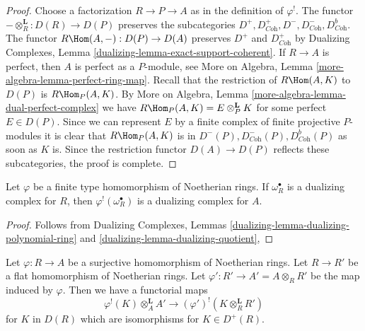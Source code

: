 \begin{proof}
Choose a factorization $R \to P \to A$ as in the definition of $\varphi^!$.
The functor $- \otimes_R^\mathbf{L} : D(R) \to D(P)$ preserves
the subcategories
$D^+, D^+_{\textit{Coh}}, D^-, D^-_{\textit{Coh}}, D^b_{\textit{Coh}}$.
The functor $R\Hom(A, -) : D(P) \to D(A)$
preserves $D^+$ and $D^+_{\textit{Coh}}$ by
Dualizing Complexes, Lemma \ref{dualizing-lemma-exact-support-coherent}.
If $R \to A$ is perfect, then $A$ is perfect as a $P$-module, see
More on Algebra, Lemma \ref{more-algebra-lemma-perfect-ring-map}.
Recall that the restriction of $R\Hom(A, K)$ to $D(P)$ is
$R\Hom_P(A, K)$. By More on Algebra, Lemma
\ref{more-algebra-lemma-dual-perfect-complex}
we have $R\Hom_P(A, K) = E \otimes_P^\mathbf{L} K$ for
some perfect $E \in D(P)$. Since we can represent $E$ by
a finite complex of finite projective $P$-modules
it is clear that $R\Hom_P(A, K)$ is in
$D^-(P), D^-_{\textit{Coh}}(P), D^b_{\textit{Coh}}(P)$
as soon as $K$ is. Since the restriction functor
$D(A) \to D(P)$ reflects these subcategories, the
proof is complete.
\end{proof}

\begin{lemma}
\label{lemma-shriek-dualizing-algebraic}
Let $\varphi$ be a finite type homomorphism of Noetherian rings.
If $\omega_R^\bullet$ is a dualizing complex for $R$, then
$\varphi^!(\omega_R^\bullet)$ is a dualizing complex for $A$.
\end{lemma}

\begin{proof}
Follows from Dualizing Complexes, Lemmas
\ref{dualizing-lemma-dualizing-polynomial-ring} and
\ref{dualizing-lemma-dualizing-quotient},
\end{proof}

\begin{lemma}
\label{lemma-flat-bc-surjection}
Let $\varphi : R \to A$ be a surjective homomorphism of Noetherian rings.
Let $R \to R'$ be a flat homomorphism of Noetherian rings.
Let $\varphi' : R' \to A' = A \otimes_R R'$ be the map induced by $\varphi$.
Then we have a functorial maps
$$
\varphi^!(K) \otimes_A^\mathbf{L} A'
\longrightarrow
(\varphi')^!(K \otimes_R^\mathbf{L} R')
$$
for $K$ in $D(R)$ which are isomorphisms for $K \in D^+(R)$.
\end{lemma}

